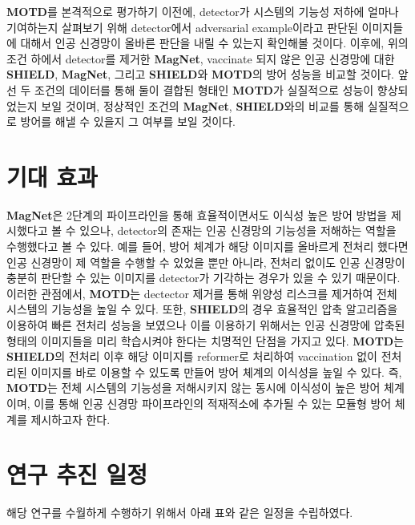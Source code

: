 \documentclass{article}
\begin{document}
\textbf{MOTD}를 본격적으로 평가하기 이전에, detector가 시스템의 기능성 저하에 얼마나 기여하는지 살펴보기 위해 detector에서 adversarial example이라고 판단된 이미지들에 대해서 인공 신경망이 올바른 판단을 내릴 수 있는지 확인해볼 것이다. 이후에, 위의 조건 하에서 detector를 제거한 \textbf{MagNet}, vaccinate 되지 않은 인공 신경망에 대한 \textbf{SHIELD}, \textbf{MagNet}, 그리고 \textbf{SHIELD}와 \textbf{MOTD}의 방어 성능을 비교할 것이다. 앞선 두 조건의 데이터를 통해 둘이 결합된 형태인 \textbf{MOTD}가 실질적으로 성능이 향상되었는지 보일 것이며, 정상적인 조건의 \textbf{MagNet}, \textbf{SHIELD}와의 비교를 통해 실질적으로 방어를 해낼 수 있을지 그 여부를 보일 것이다.  

\section{기대 효과}

\textbf{MagNet}은 2단계의 파이프라인을 통해 효율적이면서도 이식성 높은 방어 방법을 제시했다고 볼 수 있으나, detector의 존재는 인공 신경망의 기능성을 저해하는 역할을 수행했다고 볼 수 있다. 예를 들어, 방어 체계가 해당 이미지를 올바르게 전처리 했다면 인공 신경망이 제 역할을 수행할 수 있었을 뿐만 아니라, 전처리 없이도 인공 신경망이 충분히 판단할 수 있는 이미지를 detector가 기각하는 경우가 있을 수 있기 때문이다. 이러한 관점에서, \textbf{MOTD}는 dectector 제거를 통해 위양성 리스크를 제거하여 전체 시스템의 기능성을 높일 수 있다. 또한, \textbf{SHIELD}의 경우 효율적인 압축 알고리즘을 이용하여 빠른 전처리 성능을 보였으나 이를 이용하기 위해서는 인공 신경망에 압축된 형태의 이미지들을 미리 학습시켜야 한다는 치명적인 단점을 가지고 있다. \textbf{MOTD}는 \textbf{SHIELD}의 전처리 이후 해당 이미지를 reformer로 처리하여 vaccination 없이 전처리된 이미지를 바로 이용할 수 있도록 만들어 방어 체계의 이식성을 높일 수 있다. 즉, \textbf{MOTD}는 전체 시스템의 기능성을 저해시키지 않는 동시에 이식성이 높은 방어 체계이며, 이를 통해 인공 신경망 파이프라인의 적재적소에 추가될 수 있는 모듈형 방어 체계를 제시하고자 한다. 


\section{연구 추진 일정}

해당 연구를 수월하게 수행하기 위해서 아래 표와 같은 일정을 수립하였다. 
\end{document}
